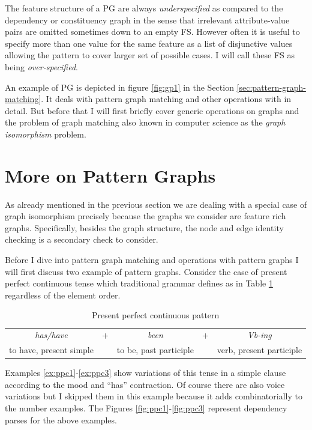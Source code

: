 The feature structure of a PG are always \textit{underspecified} as compared to the dependency or constituency graph in the sense that irrelevant attribute-value 
pairs are omitted sometimes down to an empty FS. However often it is useful to specify more than one value for the same feature as a list of disjunctive values allowing the pattern to cover larger set of possible cases. I will call these FS as being \textit{over-specified}. 

An example of PG is depicted in figure \ref{fig:gp1} in the Section \ref{sec:pattern-graph-matching}. It deals with pattern graph matching and other operations with in detail. But before that I will first briefly cover generic operations on graphs and the problem of graph matching also known in computer science as the \textit{graph isomorphism} problem.

\section{More on Pattern Graphs}
\label{sec:pattern-graphs}
As already mentioned in the previous section we are dealing with a special case of graph isomorphism precisely because the graphs we consider are feature rich graphs. Specifically, besides the graph structure, the node and edge identity checking is a secondary check to consider.

Before I dive into pattern graph matching and operations with pattern graphs I will first discuss two example of pattern graphs. Consider the case of present perfect continuous tense which traditional grammar defines as in Table \ref{tab:ppc-pattern} regardless of the element order. 

\begin{table}[H]
	\centering
	\begin{tabular}{|clclc|}
		\hline
		\textit{has/have}       & + & \textit{been}          & + & \textit{Vb-ing}          \\
		to have, present simple &   & to be, past participle &   & verb, present participle \\ \hline
	\end{tabular}
	\caption{Present perfect continuous pattern}
	\label{tab:ppc-pattern}
\end{table}

Examples \ref{ex:ppc1}-\ref{ex:ppc3} show variations of this tense in a simple clause according to the mood and ``has'' contraction. Of course there are also voice variations but I skipped them in this example because it adds combinatorially to the number examples. The Figures \ref{fig:ppc1}-\ref{fig:ppc3} represent dependency parses for the above examples.

